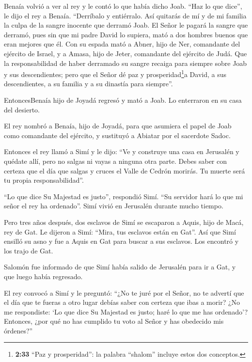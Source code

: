 Benaía volvió a ver al rey y le contó lo que había dicho Joab.
 ``Haz lo que dice'', le dijo el rey a Benaía. ``Derríbalo
y entiérralo. Así quitarás de mí y de mi familia la culpa de la sangre
inocente que derramó Joab.  El Señor le pagará la sangre
que derramó, pues sin que mi padre David lo supiera, mató a dos hombres
buenos que eran mejores que él. Con su espada mató a Abner, hijo de Ner,
comandante del ejército de Israel, y a Amasa, hijo de Jeter, comandante
del ejército de Judá.  Que la responsabilidad de haber
derramado su sangre recaiga para siempre sobre Joab y sus descendientes;
pero que el Señor dé paz y prosperidad\footnote{\textbf{2:33} ``Paz y
  prosperidad'': la palabra ``shalom'' incluye estos dos conceptos.}a
David, a sus descendientes, a su familia y a su dinastía para siempre''.

 EntoncesBenaía hijo de Joyadá regresó y mató a Joab. Lo
enterraron en su casa del desierto.

 El rey nombró a Benaía, hijo de Joyadá, para que asumiera
el papel de Joab como comandante del ejército, y sustituyó a Abiatar por
el sacerdote Sadoc.

 Entonces el rey llamó a Simí y le dijo: ``Ve y construye
una casa en Jerusalén y quédate allí, pero no salgas ni vayas a ninguna
otra parte.  Debes saber con certeza que el día que salgas
y cruces el Valle de Cedrón morirás. Tu muerte será tu propia
responsabilidad''.

 ``Lo que dice Su Majestad es justo'', respondió Simí. ``Su
servidor hará lo que mi señor el rey ha ordenado''. Simí vivió en
Jerusalén durante mucho tiempo.

 Pero tres años después, dos esclavos de Simí se escaparon
a Aquis, hijo de Macá, rey de Gat. Le dijeron a Simí: ``Mira, tus
esclavos están en Gat''.  Así que Simí ensilló su asno y
fue a Aquis en Gat para buscar a sus esclavos. Los encontró y los trajo
de Gat.

 Salomón fue informado de que Simí había salido de
Jerusalén para ir a Gat, y que luego había regresado.

 El rey convocó a Simí y le preguntó: ``¿No te juré por el
Señor, no te advertí que el día que te fueras a otro lugar debías saber
con certeza que ibas a morir? ¿No me respondiste: `Lo que dice Su
Majestad es justo; haré lo que me has ordenado'?  Entonces,
¿por qué no has cumplido tu voto al Señor y has obedecido mis órdenes?''

